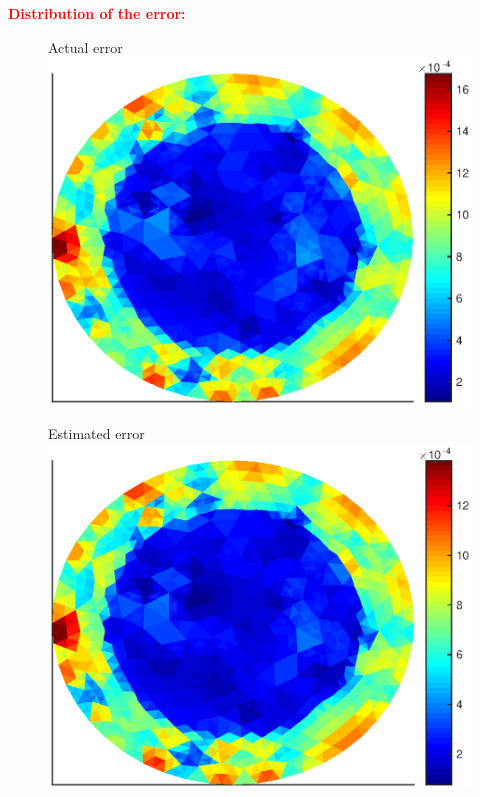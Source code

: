\documentclass[10 pt]{beamer}
\begin{document}
\begin{frame}
\textcolor{red}{\textbf{Distribution of the error:}}
\begin{figure}[H]
\begin{minipage}[c]{.50\linewidth}
   \centering
   Actual error
\includegraphics[width=\textwidth]{fig_article/estimator_actual_error_inexact_newton_iter_30second_level.eps}    
\end{minipage}\hfill
\begin{minipage}[c]{.50\linewidth}
   \centering
   Estimated error
\includegraphics[width=\textwidth]{fig_article/energy_norm_second_level_inexact_newton_iter_30.eps}     
\end{minipage}\hfill
\end{figure}
\end{frame}
\end{document}
